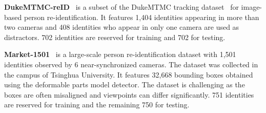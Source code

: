 \documentclass[10pt,twocolumn,letterpaper]{article}
\begin{document}
\noindent\textbf{DukeMTMC-reID}~\cite{ristani2016performance, zheng2017unlabeled} is a subset of the DukeMTMC tracking dataset~\cite{ristani2016performance} for image-based person re-identification. It features 1,404 identities appearing in more than two cameras and 408 identities who appear in only one camera are used as distractors. 702 identities are reserved for training and 702 for testing.  

\noindent\textbf{Market-1501}~\cite{zheng2015scalable} is a large-scale person re-identification dataset with 1,501 identities observed by 6 near-synchronized cameras. The dataset was collected in the campus of Tsinghua University. It features 32,668 bounding boxes obtained using the deformable parts model detector. The dataset is challenging as the boxes are often misaligned and viewpoints can differ significantly. 751 identities are reserved for training and the remaining 750 for testing. 
\end{document}
